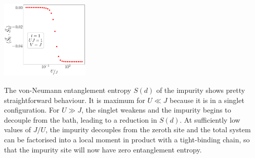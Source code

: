 \documentclass{report}
\numberwithin{equation}{section}
\begin{document}
\begin{center}
	\includegraphics[width=0.32\textwidth]{../figures/r-vec-corr-03-t=1.000,J=1_over_U,V=J,N=6,U=0.016,91.116,32.pdf}

\end{center}

The von-Neumann entanglement entropy \(S(d)\) of the impurity shows pretty straightforward behaviour. It is maximum for \(U \ll J\) because it is in a singlet configuration. For \(U \gg J\), the singlet weakens and the impurity begins to decouple from the bath, leading to a reduction in \(S(d)\). At sufficiently low values of \(J/U\), the impurity decouples from the zeroth site and the total system can be factorised into a local moment in product with a tight-binding chain, so that the impurity site will now have zero entanglement entropy.
\end{document}
